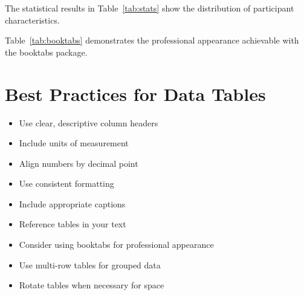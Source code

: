 \documentclass{article}
\begin{document}
The statistical results in Table~\ref{tab:stats} show the distribution of participant characteristics.

Table~\ref{tab:booktabs} demonstrates the professional appearance achievable with the booktabs package.

\section{Best Practices for Data Tables}
\begin{itemize}
    \item Use clear, descriptive column headers
    \item Include units of measurement
    \item Align numbers by decimal point
    \item Use consistent formatting
    \item Include appropriate captions
    \item Reference tables in your text
    \item Consider using booktabs for professional appearance
    \item Use multi-row tables for grouped data
    \item Rotate tables when necessary for space
\end{itemize}
\end{document}
